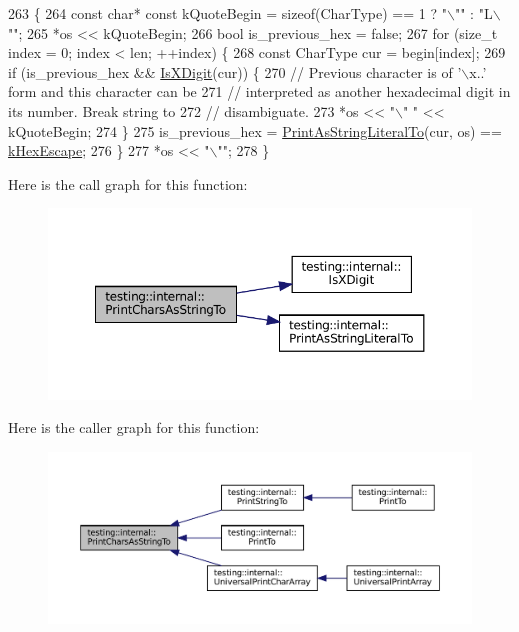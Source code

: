 \begin{DoxyCode}
263                                                     \{
264   \textcolor{keyword}{const} \textcolor{keywordtype}{char}* \textcolor{keyword}{const} kQuoteBegin = \textcolor{keyword}{sizeof}(CharType) == 1 ? \textcolor{stringliteral}{"\(\backslash\)""} : \textcolor{stringliteral}{"L\(\backslash\)""};
265   *os << kQuoteBegin;
266   \textcolor{keywordtype}{bool} is\_previous\_hex = \textcolor{keyword}{false};
267   \textcolor{keywordflow}{for} (\textcolor{keywordtype}{size\_t} index = 0; index < len; ++index) \{
268     \textcolor{keyword}{const} CharType cur = begin[index];
269     \textcolor{keywordflow}{if} (is\_previous\_hex && \hyperlink{namespacetesting_1_1internal_aa234ef141278263fb143b616c74c86e7}{IsXDigit}(cur)) \{
270       \textcolor{comment}{// Previous character is of '\(\backslash\)x..' form and this character can be}
271       \textcolor{comment}{// interpreted as another hexadecimal digit in its number. Break string to}
272       \textcolor{comment}{// disambiguate.}
273       *os << \textcolor{stringliteral}{"\(\backslash\)" "} << kQuoteBegin;
274     \}
275     is\_previous\_hex = \hyperlink{namespacetesting_1_1internal_a82e5b3cf45fd9c4603dbe14bc4cb38c2}{PrintAsStringLiteralTo}(cur, os) == 
      \hyperlink{namespacetesting_1_1internal_ae2ef98247c76a50cdc80ceb4a6c81793aebfa5293302338a8e8678744c103f113}{kHexEscape};
276   \}
277   *os << \textcolor{stringliteral}{"\(\backslash\)""};
278 \}
\end{DoxyCode}
Here is the call graph for this function\+:
\nopagebreak
\begin{figure}[H]
\begin{center}
\leavevmode
\includegraphics[width=350pt]{namespacetesting_1_1internal_a0be71e6d7cb274131c559193f81c83e2_cgraph}
\end{center}
\end{figure}
Here is the caller graph for this function\+:
\nopagebreak
\begin{figure}[H]
\begin{center}
\leavevmode
\includegraphics[width=350pt]{namespacetesting_1_1internal_a0be71e6d7cb274131c559193f81c83e2_icgraph}
\end{center}
\end{figure}
